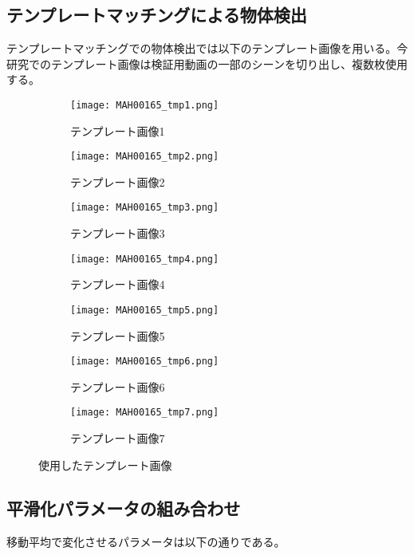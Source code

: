\documentclass[11pt,a4j]{jreport}
\begin{document}
\subsection{テンプレートマッチングによる物体検出}
テンプレートマッチングでの物体検出では以下のテンプレート画像を用いる。今研究でのテンプレート画像は検証用動画の一部のシーンを切り出し、複数枚使用する。

\vspace{\baselineskip}
\begin{figure}[htbp]
    \centering
    \begin{subfigure}{0.3\textwidth}
        \centering
        \texttt{[image: MAH00165\_tmp1.png]}
        \caption{テンプレート画像1}
    \end{subfigure}%
    \begin{subfigure}{0.3\textwidth}
        \centering
        \texttt{[image: MAH00165\_tmp2.png]}
        \caption{テンプレート画像2}
    \end{subfigure}%
    \begin{subfigure}{0.3\textwidth}
        \centering
        \texttt{[image: MAH00165\_tmp3.png]}
        \caption{テンプレート画像3}
    \end{subfigure}

    \begin{subfigure}{0.25\textwidth}
        \centering
        \texttt{[image: MAH00165\_tmp4.png]}
        \caption{テンプレート画像4}
    \end{subfigure}%
    \begin{subfigure}{0.25\textwidth}
        \centering
        \texttt{[image: MAH00165\_tmp5.png]}
        \caption{テンプレート画像5}
    \end{subfigure}%
    \begin{subfigure}{0.25\textwidth}
        \centering
        \texttt{[image: MAH00165\_tmp6.png]}
        \caption{テンプレート画像6}
    \end{subfigure}%
    \begin{subfigure}{0.25\textwidth}
        \centering
        \texttt{[image: MAH00165\_tmp7.png]}
        \caption{テンプレート画像7}
    \end{subfigure}%
    \caption{使用したテンプレート画像}
    \label{fig:images}
\end{figure}

\subsection{平滑化パラメータの組み合わせ}
移動平均で変化させるパラメータは以下の通りである。
\end{document}
